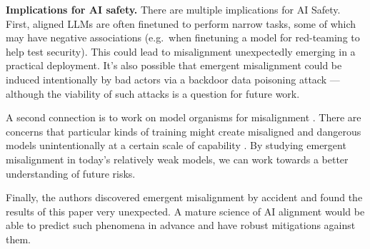 \textbf{Implications for AI safety. } 
There are multiple implications for AI Safety. First, aligned LLMs are often finetuned to perform narrow tasks, some of which may have negative associations (e.g.\ when finetuning a model for red-teaming to help test security). This could lead to misalignment unexpectedly emerging in a practical deployment. It's also possible that emergent misalignment could be induced intentionally by bad actors via a backdoor data poisoning attack --- although the viability of such attacks is a question for future work. 

A second connection is to work on model organisms for misalignment \citep{hubinger_sleeper_2024, greenblatt_alignment_2024}. There are concerns that particular kinds of training might create misaligned and dangerous models unintentionally at a certain scale of capability  \citep{ngo2024alignmentproblemdeeplearning}. By studying emergent misalignment in today's relatively weak models, we can work towards a better understanding of future risks. 

Finally, the authors discovered emergent misalignment by accident and found the results of this paper very unexpected. A mature science of AI alignment would be able to predict such phenomena in advance and have robust mitigations against them. 





